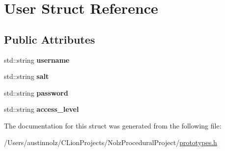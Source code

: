 \hypertarget{struct_user}{}\section{User Struct Reference}
\label{struct_user}
\subsection*{Public Attributes}
\begin{DoxyCompactItemize}
\item 
\mbox{\label{struct_user_aacbb807e514280f69e00bec7d71f3aee}} 
std\+::string {\bfseries username}
\item 
\mbox{\label{struct_user_a7e6b6ac23f97bfd26d6845a91987a42f}} 
std\+::string {\bfseries salt}
\item 
\mbox{\label{struct_user_ac2f2e75b15e8eb6cbb030fc85a6cd59f}} 
std\+::string {\bfseries password}
\item 
\mbox{\label{struct_user_a684662a5fcdd416326d8347b6593c1e9}} 
std\+::string {\bfseries access\+\_\+level}
\end{DoxyCompactItemize}


The documentation for this struct was generated from the following file\+:\begin{DoxyCompactItemize}
\item 
/\+Users/austinnolz/\+C\+Lion\+Projects/\+Nolz\+Procedural\+Project/\mbox{\hyperlink{prototypes_8h}{prototypes.\+h}}\end{DoxyCompactItemize}
